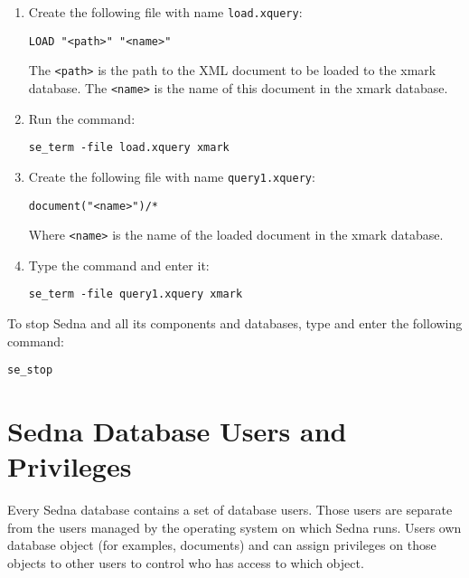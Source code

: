 \documentclass[a4paper,12pt]{article}
\begin{document}
\begin{enumerate}
\item Create the following file with name \verb!load.xquery!:

\begin{verbatim}
LOAD "<path>" "<name>"
\end{verbatim}

The \verb!<path>! is the path to the XML document to be loaded to the xmark database. The \verb!<name>! is the name of this document in the xmark database.

\item Run the command: 

\begin{verbatim}
se_term -file load.xquery xmark
\end{verbatim}

\item Create the following file with name \verb!query1.xquery!:

\begin{verbatim}
document("<name>")/*
\end{verbatim}

Where \verb!<name>! is the name of the loaded document in the xmark database.

\item Type the command and enter it:
\begin{verbatim}
se_term -file query1.xquery xmark
\end{verbatim}
\end{enumerate}

To stop Sedna and all its components and databases, type and enter the following command:

\begin{verbatim}
se_stop
\end{verbatim}



%
%
%
%
\section{Sedna Database Users and Privileges}

Every Sedna database contains a set of database users. Those users are separate from the users managed by the operating system on which Sedna runs. Users own database object (for examples, documents) and can assign privileges on those objects to other users to control who has access to which object. 
\end{document}
